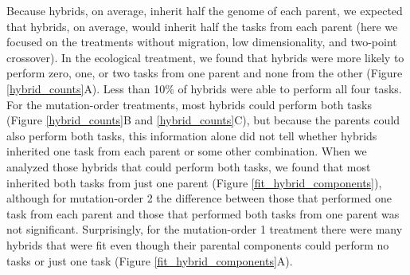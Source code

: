 \begin{doublespace}
Because hybrids, on average, inherit half the genome of each parent,
we expected that hybrids, on average, would inherit half the tasks
from each parent (here we focused on the treatments without migration,
low dimensionality, and two-point crossover).
%
In the ecological treatment, we found that hybrids were more likely to perform
zero, one, or two tasks from one parent and none from the other
(Figure \ref{hybrid_counts}A).
%
Less than 10\% of hybrids were able to perform all four tasks.
%
For the mutation-order treatments,
most hybrids could perform both tasks
(Figure \ref{hybrid_counts}B and \ref{hybrid_counts}C),
but because the parents could also perform both tasks,
this information alone did not tell whether hybrids inherited
one task from each parent or some other combination.
%
When we analyzed those hybrids that could perform both tasks,
we found that most inherited both tasks from just one parent
(Figure \ref{fit_hybrid_components}),
although for mutation-order 2
the difference between those
that performed one task from each parent
and those that performed both tasks from one parent
was not significant.
%
Surprisingly, for the mutation-order 1 treatment
there were many hybrids that were fit
even though their parental components
could perform no tasks or just one task
(Figure \ref{fit_hybrid_components}A).




\end{doublespace}
